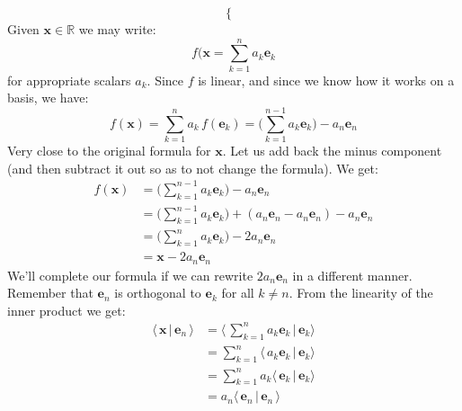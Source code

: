 \documentclass{article}
\theoremstyle{normal}
\newenvironment{example}{%
    \pushQED{\qed}\renewcommand{\qedsymbol}{$\blacksquare$}\examplex%
}{%
    \popQED\endexamplex%
}
\begin{document}
\begin{example}[\textbf{Reflections}]
\begin{equation}
\begin{cases}
            \end{cases}
        \end{equation}
        Given $\mathbf{x}\in\mathbb{R}$ we may write:
        \begin{equation}
            f(\mathbf{x}=\sum_{k=1}^{n}a_{k}\mathbf{e}_{k}
        \end{equation}
        for appropriate scalars $a_{k}$. Since $f$ is linear, and since we know
        how it works on a basis, we have:
        \begin{equation}
            f(\mathbf{x})=\sum_{k=1}^{n}a_{k}\,f(\mathbf{e}_{k})
            =\Big(\sum_{k=1}^{n-1}a_{k}\mathbf{e}_{k}\Big)-a_{n}\mathbf{e}_{n}
        \end{equation}
        Very close to the original formula for $\mathbf{x}$. Let us add back
        the minus component (and then subtract it out so as to not change the
        formula). We get:
        \begin{align}
            f(\mathbf{x})
            &=\Big(
                \sum_{k=1}^{n-1}a_{k}\mathbf{e}_{k}
            \Big)-a_{n}\mathbf{e}_{n}\\
            &=\Big(
                \sum_{k=1}^{n-1}a_{k}\mathbf{e}_{k}
            \Big)+(a_{n}\mathbf{e}_{n}-a_{n}\mathbf{e}_{n})
            -a_{n}\mathbf{e}_{n}\\
            &=\Big(
                \sum_{k=1}^{n}a_{k}\mathbf{e}_{k}
            \Big)-2a_{n}\mathbf{e}_{n}\\
            &=\mathbf{x}-2a_{n}\mathbf{e}_{n}
        \end{align}
        We'll complete our formula if we can rewrite $2a_{n}\mathbf{e}_{n}$ in
        a different manner. Remember that $\mathbf{e}_{n}$ is
        orthogonal to $\mathbf{e}_{k}$ for all $k\ne{n}$. From the linearity of
        the inner product we get:
        \begin{align}
            \langle\,\mathbf{x}\,|\,\mathbf{e}_{n}\,\rangle
            &=
            \langle\,
                \sum_{k=1}^{n}a_{k}\mathbf{e}_{k}\,|\,\mathbf{e}_{k}
            \rangle\\
            &=
            \sum_{k=1}^{n}\langle\,
                a_{k}\mathbf{e}_{k}\,|\,\mathbf{e}_{k}
            \rangle\\
            &=\sum_{k=1}^{n}a_{k}\langle\,
                \mathbf{e}_{k}\,|\,\mathbf{e}_{k}
            \rangle\\
            &=a_{n}\langle\,\mathbf{e}_{n}\,|\,\mathbf{e}_{n}\,\rangle
        \end{align}

\end{example}
\end{document}

